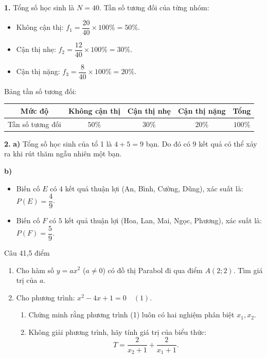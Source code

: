 \begin{loi_giai_cau}
\textbf{1.} Tổng số học sinh là $N = 40$.
Tần số tương đối của từng nhóm:
\begin{itemize}
\item Không cận thị: $f_1 = \dfrac{20}{40} \times 100\% = 50\%$.
\item Cận thị nhẹ: $f_2 = \dfrac{12}{40} \times 100\% = 30\%$.
\item Cận thị nặng: $f_3 = \dfrac{8}{40} \times 100\% = 20\%$.
\end{itemize}
Bảng tần số tương đối:
\begin{center}
\begin{tabular}{|c|c|c|c|c|}
\hline
Mức độ & Không cận thị & Cận thị nhẹ & Cận thị nặng & Tổng \\ \hline
Tần số tương đối & $50\%$ & $30\%$ & $20\%$ & $100\%$ \\ \hline
\end{tabular}
\end{center}

\textbf{2.}
\textbf{a)} Tổng số học sinh của tổ 1 là $4 + 5 = 9$ bạn.
Do đó có $\boxed{9}$ kết quả có thể xảy ra khi rút thăm ngẫu nhiên một bạn.

\textbf{b)}
\begin{itemize}
\item Biến cố $E$ có $4$ kết quả thuận lợi (An, Bình, Cường, Dũng), xác suất là: $P(E) = \boxed{\dfrac{4}{9}}$.
\item Biến cố $F$ có $5$ kết quả thuận lợi (Hoa, Lan, Mai, Ngọc, Phương), xác suất là: $P(F) = \boxed{\dfrac{5}{9}}$.
\end{itemize}
\end{loi_giai_cau}

\begin{de_cau}{Câu 4}{1,5 điểm}
\begin{enumerate}[label=\arabic*.]
\item Cho hàm số $y = ax^2$ ($a \neq 0$) có đồ thị Parabol đi qua điểm $A(2; 2)$. Tìm giá trị của $a$.
\item Cho phương trình: $x^2 - 4x + 1 = 0 \quad (1)$.
\begin{enumerate}[label=\alph*)]
\item Chứng minh rằng phương trình (1) luôn có hai nghiệm phân biệt $x_1, x_2$.
\item Không giải phương trình, hãy tính giá trị của biểu thức:
\[T = \dfrac{2}{x_2+1} + \dfrac{2}{x_1+1}.\]
\end{enumerate}
\end{enumerate}
\end{de_cau}

